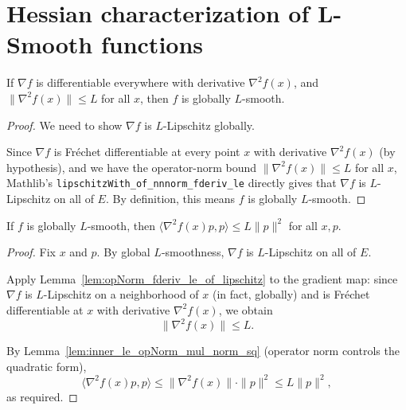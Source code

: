 
\chapter{Hessian characterization of L-Smooth functions}\label{sec:HessianVsSmoothness}

\begin{theorem}\label{thm:hessianBoundImpliesLSmoothOnUniv}
  \leanok{}
  If $\nabla f$ is differentiable everywhere with derivative $\nabla^2 f(x)$, and $\|\nabla^2 f(x)\|\le L$
  for all $x$, then $f$ is globally $L$-smooth.
\end{theorem}

\begin{proof}
  \leanok{}
  We need to show $\nabla f$ is $L$-Lipschitz globally.

  Since $\nabla f$ is Fr\'echet differentiable at every point $x$ with derivative $\nabla^2 f(x)$
  (by hypothesis), and we have the operator-norm bound $\|\nabla^2 f(x)\| \le L$ for all $x$,
  Mathlib's \texttt{lipschitzWith\_of\_nnnorm\_fderiv\_le} directly gives that
  $\nabla f$ is $L$-Lipschitz on all of $E$. By definition, this means $f$ is globally $L$-smooth.
\end{proof}

\begin{theorem}\label{thm:lSmoothOnUnivImpliesHessianQuadraticFormBound}
  \leanok{}
  If $f$ is globally $L$-smooth, then
  $\langle \nabla^2 f(x)p,p\rangle \le L\|p\|^2$ for all $x,p$.
\end{theorem}

\begin{proof}
  \leanok{}
  Fix $x$ and $p$. By global $L$-smoothness, $\nabla f$ is $L$-Lipschitz on all of $E$.

  Apply Lemma~\ref{lem:opNorm_fderiv_le_of_lipschitz} to the gradient map: since $\nabla f$ is
  $L$-Lipschitz on a neighborhood of $x$ (in fact, globally) and is Fr\'echet differentiable at $x$
  with derivative $\nabla^2 f(x)$, we obtain
  \[
    \|\nabla^2 f(x)\| \le L.
  \]

  By Lemma~\ref{lem:inner_le_opNorm_mul_norm_sq} (operator norm controls the quadratic form),
  \[
    \langle \nabla^2 f(x) p, p \rangle \le \|\nabla^2 f(x)\| \cdot \|p\|^2 \le L \|p\|^2,
  \]
  as required.
\end{proof}

